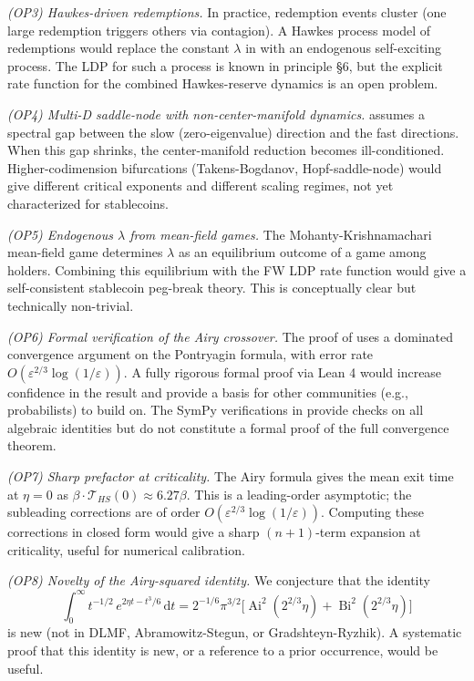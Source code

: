 \documentclass[11pt,a4paper]{article}
\theoremstyle{plain}
\theoremstyle{definition}
\newcommand{\eps}{\varepsilon}
\renewcommand{\d}{\mathrm{d}}
\newcommand{\Ai}{\operatorname{Ai}}
\newcommand{\Bi}{\operatorname{Bi}}
\begin{document}
\emph{(OP3) Hawkes-driven redemptions.} In practice, redemption events cluster (one large redemption triggers others via contagion). A Hawkes process model of redemptions would replace the constant $\lambda$ in  with an endogenous self-exciting process. The LDP for such a process is known in principle \cite{FreidlinWentzell2012} \S 6, but the explicit rate function for the combined Hawkes-reserve dynamics is an open problem.

\emph{(OP4) Multi-D saddle-node with non-center-manifold dynamics.}  assumes a spectral gap between the slow (zero-eigenvalue) direction and the fast directions. When this gap shrinks, the center-manifold reduction becomes ill-conditioned. Higher-codimension bifurcations (Takens-Bogdanov, Hopf-saddle-node) would give different critical exponents and different scaling regimes, not yet characterized for stablecoins.

\emph{(OP5) Endogenous $\lambda$ from mean-field games.} The Mohanty-Krishnamachari mean-field game \cite{MohantyKrishnamachari2026} determines $\lambda$ as an equilibrium outcome of a game among holders. Combining this equilibrium with the FW LDP rate function would give a self-consistent stablecoin peg-break theory. This is conceptually clear but technically non-trivial.

\emph{(OP6) Formal verification of the Airy crossover.} The proof of  uses a dominated convergence argument on the Pontryagin formula, with error rate $O(\eps^{2/3}\log(1/\eps))$. A fully rigorous formal proof via Lean 4 would increase confidence in the result and provide a basis for other communities (e.g., probabilists) to build on. The SymPy verifications in  provide checks on all algebraic identities but do not constitute a formal proof of the full convergence theorem.

\emph{(OP7) Sharp prefactor at criticality.} The Airy formula gives the mean exit time at $\eta = 0$ as $\beta\cdot\mathcal T_{HS}(0) \approx 6.27\beta$. This is a leading-order asymptotic; the subleading corrections are of order $O(\eps^{2/3}\log(1/\eps))$. Computing these corrections in closed form would give a sharp $(n+1)$-term expansion at criticality, useful for numerical calibration.

\emph{(OP8) Novelty of the Airy-squared identity.} We conjecture that the identity
$$\int_0^\infty t^{-1/2}\,e^{2\eta t - t^3/6}\,\d t = 2^{-1/6}\pi^{3/2}\Big[\Ai^2(2^{2/3}\eta) + \Bi^2(2^{2/3}\eta)\Big]$$
is new (not in DLMF, Abramowitz-Stegun, or Gradshteyn-Ryzhik). A systematic proof that this identity is new, or a reference to a prior occurrence, would be useful.
\end{document}
